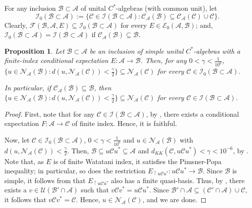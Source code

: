 \documentclass{amsart}
\numberwithin{equation}{section}
\newcommand{\mcal}{\mathcal}
\newcommand{\1}{\mathbf{1}}
\newcommand{\mU}{\mathcal{U}}
\newcommand{\mA}{\mathcal{A}}
\newcommand{\mB}{\mathcal{B}}
\newcommand{\mC}{\mathcal{C}}
\newcommand{\mE}{\mathcal{E}}
\newcommand{\mN}{\mathcal{N}}
\newtheorem{proposition}[theorem]{Proposition}
\begin{document}
 For any inclusion $\mB \subset \mA$ of
unital $C^*$-algebras (with common unit), let
\begin{equation}\label{I0BAE-defn}
 \mcal{I}_0(\mB \subset \mA):=\big\{ \mC \in \mcal{I}(\mB \subset \mA):
\mC_{\mA}(\mB) \subseteq \mC_{\mA}(\mC) \cup \mC\big\}.
\end{equation}
Clearly, $ \mcal{F}(\mB, \mA, E) \subseteq \mcal{I}_0(\mB \subset
\mA)$ for every $E \in \mE_0(\mA, \mB)$; and, $
\mcal{I}_0(\mB \subset \mA) = \mcal{I}(\mB \subset \mA)$ if
$\mC_{\mA}(\mB) \subseteq \mB$.


\begin{proposition}\label{u-close-to-normalizer-simple}
Let $\mB \subset \mA$ be an inclusion of simple unital $C^*$-algebras
with a finite-index conditional expectation $E: \mA \to \mB$.  Then,
for any $0< \gamma < \frac{1}{10^{6}}$,
\(
\big\{ u \in {\mN}_{\mA}(\mB): d(u, \mN_{\mA}(\mC)) < \frac{\gamma}{2}\big\}
\subseteq  \mN_{\mA}(\mC)\) for every $\mC \in \mcal{I}_0(\mB \subset
\mA)$. 

In particular, if $\mC_{\mA}(\mB) \subseteq \mB$, then 
\(
\big\{ u \in {\mN}_{\mA}(\mB): d(u, \mN_{\mA}(\mC)) < \frac{\gamma}{2}\big\}
\subseteq  \mN_{\mA}(\mC)\) for every $\mC \in \mcal{I}(\mB \subset
\mA)$.
\end{proposition}


\begin{proof}
First, note that for any $\mC \in \mcal{I}(\mB \subset \mA)$, by
\cite[Proposition 6.1]{I}, there exists a conditional expectation $F:
\mA\rightarrow \mC$ of finite index. Hence, it is faithful.

Now, let $\mC \in \mcal{I}_{0}(\mB \subset \mA)$, $ 0 < \gamma <
\frac{1}{10^6}$ and $u \in \mN_{\mA}(\mB)$ with $d( u, \mN_{\mA}(\mC)) <
\frac{\gamma}{2}$. Then, $\mB \subseteq u \mC u^* \subseteq \mA $ and
$d_{KK}(\mC, u \mC u^*) < \gamma< 10^{-6}$, by
. Note that, as $E$ is of finite Watatani index, it
satisfies the Pimsner-Popa inequality; in particular, so does the
restriction $E_{\restriction u \mC u^*}: u \mC u^*\rightarrow \mB$.
Since $\mB$ is simple, it follows from \cite[Corollary 3.4]{I} that
$E_{\restriction u \mC u^*}$ also has a finite quasi-basis.  Thus, by
\cite[Theorem 3.7]{Dickson}, there exists a $v \in \mU(\mB'\cap \mA)$
such that $v \mC v^* = u \mC u^*$.  Since $\mB'\cap \mA \subseteq
(\mC'\cap \mA) \cup \mC$, it follows that $v \mC v^* = \mC$. Hence, $u
\in \mN_{\mA}(\mC)$, and we are done.
\end{proof}
\end{document}
